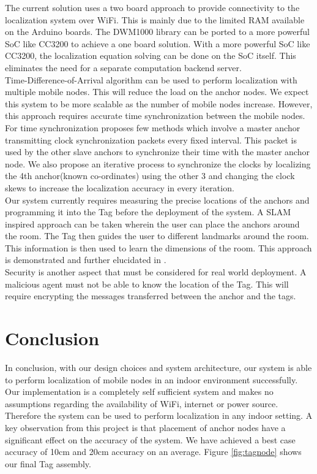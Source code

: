 \documentclass[journal,transmag]{IEEEtran}
\begin{document}
The current solution uses a two board approach to provide connectivity to the localization system over WiFi. This is mainly due to the limited RAM available on the Arduino boards. The DWM1000 library can be ported to a more powerful SoC like CC3200 to achieve a one board solution. With a more powerful SoC like CC3200, the localization equation solving can be done on the SoC itself. This eliminates the need for a separate computation backend server.\\

Time-Difference-of-Arrival algorithm can be used to perform localization with multiple mobile nodes. This will reduce the load on the anchor nodes. We expect this system to be more scalable as the number of mobile nodes increase. However, this approach requires accurate time synchronization between the mobile nodes. For time synchronization \cite{mcelroy2014comparison} proposes few methods which involve a master anchor transmitting clock synchronization packets every fixed interval. This packet is used by the other slave anchors to synchronize their time with the master anchor node. We also propose an iterative process to synchronize the clocks by localizing the 4th anchor(known co-ordinates) using the other 3 and changing the clock skews to increase the localization accuracy in every iteration.\\

Our system currently requires measuring the precise locations of the anchors and programming it into the Tag before the deployment of the system. A SLAM inspired approach can be taken wherein the user can place the anchors around the room. The Tag then guides the user to different landmarks around the room. This information is then used to learn the dimensions of the room. This approach is demonstrated and further elucidated in \cite{alps}.\\

Security is another aspect that must be considered for real world deployment. A malicious agent must not be able to know the location of the Tag. This will require encrypting the messages transferred between the anchor and the tags.\\

\section{Conclusion}
In conclusion, with our design choices and system architecture, our system is able to perform localization of mobile nodes in an indoor environment successfully. Our implementation is a completely self sufficient system and makes no assumptions regarding the availability of WiFi, internet or power source. Therefore the system can be used to perform localization in any indoor setting. A key observation from this project is that placement of anchor nodes have a significant effect on the accuracy of the system. We have achieved a best case accuracy of 10cm and 20cm accuracy on an average. Figure \ref{fig:tagnode} shows our final Tag assembly.
\end{document}
